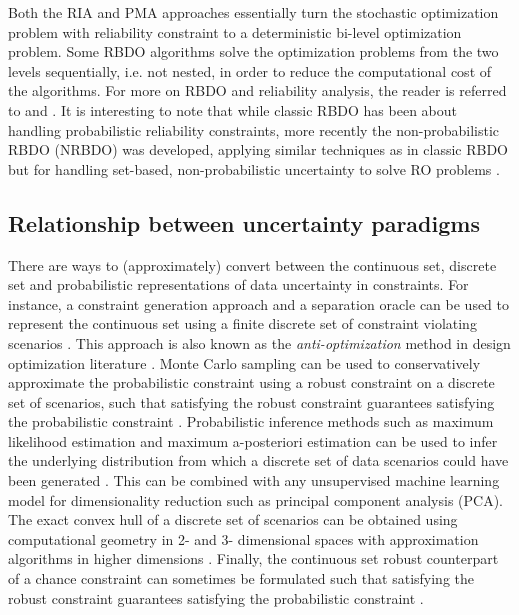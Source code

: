 Both the RIA and PMA approaches essentially turn the stochastic optimization problem with reliability constraint to a deterministic bi-level optimization problem. Some RBDO algorithms solve the optimization problems from the two levels sequentially, i.e. not nested, in order to reduce the computational cost of the algorithms. For more on RBDO and reliability analysis, the reader is referred to \cite{Choi2007} and \cite{Youn2004}. It is interesting to note that while classic RBDO has been about handling probabilistic reliability constraints, more recently the non-probabilistic RBDO (NRBDO) was developed, applying similar techniques as in classic RBDO but for handling set-based, non-probabilistic uncertainty to solve RO problems \citep{Luo2009,Kang2009,Guo2015,Zheng2018a,Wang2019a,Wang2019b}.

\subsection{Relationship between uncertainty paradigms}

There are ways to (approximately) convert between the continuous set, discrete set and probabilistic representations of data uncertainty in constraints. For instance, a constraint generation approach and a separation oracle can be used to represent the continuous set using a finite discrete set of constraint violating scenarios \citep{AharonBen-Tal2009}. This approach is also known as the \textit{anti-optimization} method in design optimization literature \citep{Elishakoff1994,Lombardi1998}. Monte Carlo sampling can be used to conservatively approximate the probabilistic constraint using a robust constraint on a discrete set of scenarios, such that satisfying the robust constraint guarantees satisfying the probabilistic constraint \citep{Tempo1996}. Probabilistic inference methods such as maximum likelihood estimation and maximum a-posteriori estimation can be used to infer the underlying distribution from which a discrete set of data scenarios could have been generated \citep{Bishop2006}. This can be combined with any unsupervised machine learning model for dimensionality reduction such as principal component analysis (PCA). The exact convex hull of a discrete set of scenarios can be obtained using computational geometry in 2- and 3- dimensional spaces \citep{DeBerg2008} with approximation algorithms in higher dimensions \citep{Sartipizadeh2016}. Finally, the continuous set robust counterpart of a chance constraint can sometimes be formulated such that satisfying the robust constraint guarantees satisfying the probabilistic constraint \citep{AharonBen-Tal2009}.

